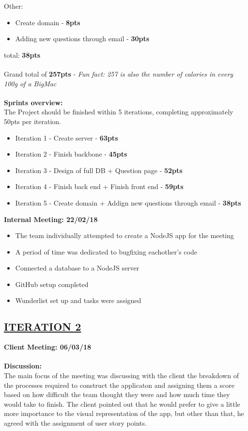 \documentclass[paper=a4,fontsize=11pt]{article}
\newcommand{\sepspace}{\vspace*{1em}}		%
\newcommand{\SectionPart}[1]{\subsection*{\uppercase{#1}}}
\begin{document}
\noindent
Other:
\begin{itemize}
	\item Create domain - \textbf{8pts}
	\item Adding new questions through email - \textbf{30pts}
\end{itemize} \hfill total: \textbf{38pts} \\\\

\noindent
Grand total of \textbf{257pts} - \textit{Fun fact: 257 is also the number of calories in every 100g of a BigMac}\\\\
\textbf{Sprints overview:}\\
The Project should be finished within 5 iterations, completing approximately 50pts per iteration.
\begin{itemize}
	\item Iteration 1 - Create server - \textbf{63pts}
	\item Iteration 2 - Finish backbone - \textbf{45pts}
	\item Iteration 3 - Design of full DB + Question page - \textbf{52pts}
	\item Iteration 4 - Finish back end + Finish front end - \textbf{59pts}
	\item Iteration 5 - Create domain + Addign new questions through email - \textbf{38pts}
\end{itemize}

\sepspace

\hfill \textbf{Internal Meeting: 22/02/18}

\begin{itemize}
	\item The team individually attempted to create a NodeJS app for the meeting
	\item A period of time was dedicated to bugfixing eachother's code
	\item Connected a database to a NodeJS server
	\item GitHub setup completed
	\item Wunderlist set up and tasks were assigned
\end{itemize}

\sepspace
\SectionPart{\ul{Iteration 2}}
\hfill \textbf{Client Meeting: 06/03/18} \\
\\
\textbf{Discussion:}\\
\noindent
The main focus of the meeting was discussing with the client the breakdown of
the processes required to construct the applicaton and assigning them a score based on how
difficult the team thought they were and how much time they would take to finish.
The client pointed out that he would prefer to give a little more importance to the
visual representation of the app, but other than that, he agreed with the assignment of user story points.\\\\
\end{document}
